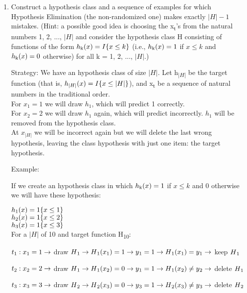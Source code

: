 \documentclass{article}
\begin{document}
\begin{enumerate}
\item Construct a hypothesis class and a sequence of examples for which Hypothesis Elimination (the non-randomized one) makes exactly $|H|-1$ mistakes. (Hint: a possible good idea is choosing the x\textsubscript{t}'s from the natural numbers 1, 2, ..., $|H|$ and consider the hypothesis class H consisting of functions of the form $h\textsubscript{k}(x) = I\{x \leq k\}$ (i.e., $h\textsubscript{k}(x) = 1$ if $x \leq k$ and
$h\textsubscript{k}(x) = 0$ otherwise) for all k = 1, 2, ..., $|H|$.)

Strategy: We have an hypothesis class of size $|H|$. Let h\textsubscript{$|H|$} be the target function (that is, $h\textsubscript{$|H|$}(x) = I\{x \leq |H|\}$), and x\textsubscript{t} be a sequence of natural numbers in the traditional order.\\
For $x_1 = 1$ we will draw $h_1$, which will predict 1 correctly.\\
For $x_2 = 2$ we will draw $h_1$ again, which will predict incorrectly. $h_1$ will be removed from the hypothesis class.\\
At $x_{|H|}$ we will be incorrect again but we will delete the last wrong hypothesis, leaving the class hypothesis with just one item: the target hypothesis.

Example:


If we create an hypothesis class in which $h\textsubscript{k}(x) = 1$ if $x \leq k$ and 0 otherwise we will have these hypothesis:

$h\textsubscript{1}(x) = 1\{x \leq 1\}$\\
$h\textsubscript{2}(x) = 1\{x \leq 2\}$\\
$h\textsubscript{3}(x) = 1\{x \leq 3\}$\\

For a $|H|$ of 10 and target function H\textsubscript{10}:

$t\textsubscript{1}: x\textsubscript{1} = 1 \rightarrow$ draw $H\textsubscript{1} \rightarrow H\textsubscript{1}(x\textsubscript{1}) = 1 \rightarrow y\textsubscript{1} = 1 \rightarrow H\textsubscript{1}(x\textsubscript{1}) = y\textsubscript{1} \rightarrow $ keep $H\textsubscript{1}$

$t\textsubscript{2}: x\textsubscript{2} = 2 \rightarrow$ draw $H\textsubscript{1} \rightarrow H\textsubscript{1}(x\textsubscript{2}) = 0 \rightarrow y\textsubscript{1} = 1 \rightarrow H\textsubscript{1}(x\textsubscript{2}) \neq y\textsubscript{2} \rightarrow $ delete $H\textsubscript{1}$

$t\textsubscript{3}: x\textsubscript{3} = 3 \rightarrow$ draw $H\textsubscript{2} \rightarrow H\textsubscript{2}(x\textsubscript{3}) = 0 \rightarrow y\textsubscript{3} = 1 \rightarrow H\textsubscript{2}(x\textsubscript{3}) \neq y\textsubscript{3} \rightarrow $ delete $H\textsubscript{2}$


\end{enumerate}
\end{document}
